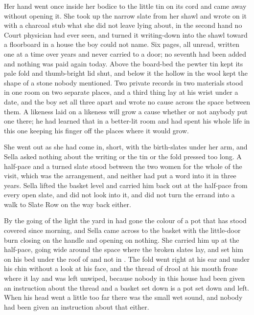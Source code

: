 Her hand went once inside her bodice to the little tin on its cord and came away without opening it. She took up the narrow slate from her shawl and wrote on it with a charcoal stub what she did not leave lying about, in the second hand no Court physician had ever seen, and turned it writing-down into the shawl toward a floorboard in a house the boy could not name. Six pages, all unread, written one at a time over years and never carried to a door; no seventh had been added and nothing was paid again today. Above the board-bed the pewter tin kept its pale fold and thumb-bright lid shut, and below it the hollow in the wool kept the shape of a stone nobody mentioned. Two private records in two materials stood in one room on two separate places, and a third thing lay at his wrist under a date, and the boy set all three apart and wrote no cause across the space between them. A likeness laid on a likeness will grow a cause whether or not anybody put one there; he had learned that in a better-lit room and had spent his whole life in this one keeping his finger off the places where it would grow.

She went out as she had come in, short, with the birth-slates under her arm, and Sella asked nothing about the writing or the tin or the fold pressed too long. A half-pace and a turned slate stood between the two women for the whole of the visit, which was the arrangement, and neither had put a word into it in three years. Sella lifted the basket level and carried him back out at the half-pace from every open slate, and did not look into it, and did not turn the errand into a walk to Slate Row on the way back either.

By the going of the light the yard in  had gone the colour of a pot that has stood covered since morning, and Sella came across to the basket with the little-door burn closing on the handle and opening on nothing. She carried him up at the half-pace, going wide around the space where the broken slates lay, and set him on his bed under the roof of  and not in . The fold went right at his ear and under his chin without a look at his face, and the thread of drool at his mouth froze where it lay and was left unwiped, because nobody in this house had been given an instruction about the thread and a basket set down is a pot set down and left. When his head went a little too far there was the small wet sound, and nobody had been given an instruction about that either.


